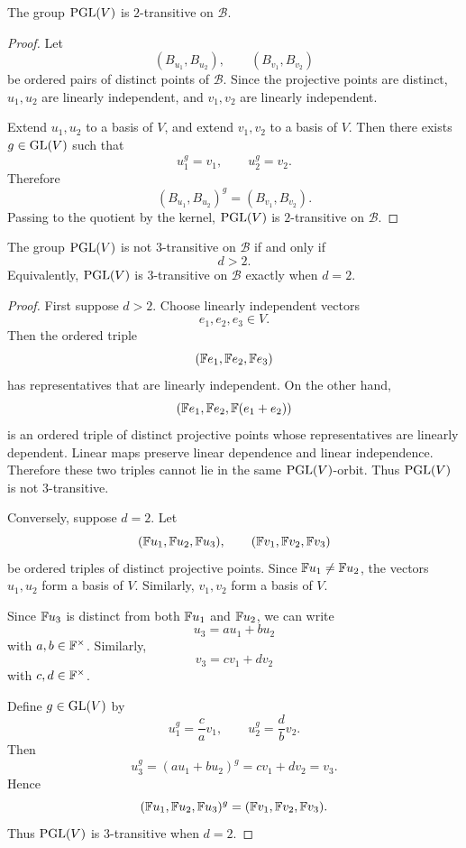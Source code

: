 \begin{proposition}
The group \(\operatorname{PGL}(V)\) is \(2\)-transitive on \(\mathcal B\).
\end{proposition}

\begin{proof}
Let
\[
    (B_{u_1},B_{u_2}),\qquad (B_{v_1},B_{v_2})
\]
be ordered pairs of distinct points of \(\mathcal B\). Since the projective points are
distinct, \(u_1,u_2\) are linearly independent, and \(v_1,v_2\) are linearly
independent.

Extend \(u_1,u_2\) to a basis of \(V\), and extend \(v_1,v_2\) to a basis of
\(V\). Then there exists \(g\in \operatorname{GL}(V)\) such that
\[
    u_1^g=v_1,\qquad u_2^g=v_2.
\]
Therefore
\[
    (B_{u_1},B_{u_2})^g=(B_{v_1},B_{v_2}).
\]
Passing to the quotient by the kernel, \(\operatorname{PGL}(V)\) is \(2\)-transitive on
\(\mathcal B\).
\end{proof}

\begin{theorem}
The group \(\operatorname{PGL}(V)\) is not \(3\)-transitive on \(\mathcal B\) if and only if
\[
    d>2.
\]
Equivalently, \(\operatorname{PGL}(V)\) is \(3\)-transitive on \(\mathcal B\) exactly when
\(d=2\).
\end{theorem}

\begin{proof}
First suppose \(d>2\). Choose linearly independent vectors
\[
    e_1,e_2,e_3\in V.
\]
Then the ordered triple
\[
    (\mathbb{F} e_1,\mathbb{F} e_2,\mathbb{F} e_3)
\]
has representatives that are linearly independent. On the other hand,
\[
    (\mathbb{F} e_1,\mathbb{F} e_2,\mathbb{F}(e_1+e_2))
\]
is an ordered triple of distinct projective points whose representatives are linearly
dependent. Linear maps preserve linear dependence and linear independence.
Therefore these two triples cannot lie in the same \(\operatorname{PGL}(V)\)-orbit. Thus
\(\operatorname{PGL}(V)\) is not \(3\)-transitive.

Conversely, suppose \(d=2\). Let
\[
    (\mathbb{F} u_1,\mathbb{F} u_2,\mathbb{F} u_3),\qquad
    (\mathbb{F} v_1,\mathbb{F} v_2,\mathbb{F} v_3)
\]
be ordered triples of distinct projective points. Since \(\mathbb{F} u_1\neq \mathbb{F} u_2\),
the vectors \(u_1,u_2\) form a basis of \(V\). Similarly, \(v_1,v_2\) form a
basis of \(V\).

Since \(\mathbb{F} u_3\) is distinct from both \(\mathbb{F} u_1\) and \(\mathbb{F} u_2\), we can write
\[
    u_3=a u_1+b u_2
\]
with \(a,b\in \mathbb{F}^\times\). Similarly,
\[
    v_3=c v_1+d v_2
\]
with \(c,d\in \mathbb{F}^\times\).

Define \(g\in \operatorname{GL}(V)\) by
\[
    u_1^g=\frac{c}{a}v_1,
    \qquad
    u_2^g=\frac{d}{b}v_2.
\]
Then
\[
    u_3^g
    =
    (a u_1+b u_2)^g
    =
    c v_1+d v_2
    =
    v_3.
\]
Hence
\[
    (\mathbb{F} u_1,\mathbb{F} u_2,\mathbb{F} u_3)^g
    =
    (\mathbb{F} v_1,\mathbb{F} v_2,\mathbb{F} v_3).
\]
Thus \(\operatorname{PGL}(V)\) is \(3\)-transitive when \(d=2\).
\end{proof}

